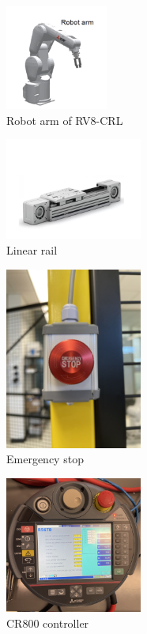 \begin{figure}[h!]
	\centering
   	\includegraphics[width=0.30\textwidth]{images/RobotArm.jpg}
    \caption{Robot arm of RV8-CRL
    }
\end{figure}
\begin{figure}[h!]
	\centering
   	\includegraphics[width=0.40\textwidth]{images/LinearRail.jpg}
    \caption{Linear rail}
\end{figure}

\begin{figure}[h!]
	\centering
   	\includegraphics[width=0.40\textwidth, angle = -90]{images/EStop.JPG}
    \caption{Emergency stop}
\end{figure}

\begin{figure}[h!]
	\centering
   	\includegraphics[width=0.40\textwidth]{images/CR800.jpg}
    \caption{CR800 controller}
\end{figure}



